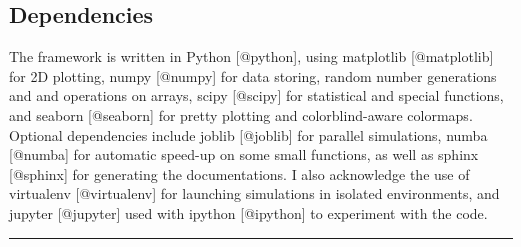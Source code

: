 \hypertarget{dependencies}{%
\subsection{Dependencies}\label{dependencies}}

The framework is written in Python {[}@python{]}, using matplotlib
{[}@matplotlib{]} for 2D plotting, numpy {[}@numpy{]} for data storing,
random number generations and and operations on arrays, scipy
{[}@scipy{]} for statistical and special functions, and seaborn
{[}@seaborn{]} for pretty plotting and colorblind-aware colormaps.
Optional dependencies include joblib {[}@joblib{]} for parallel
simulations, numba {[}@numba{]} for automatic speed-up on some small
functions, as well as sphinx {[}@sphinx{]} for generating the
documentations. I also acknowledge the use of virtualenv
{[}@virtualenv{]} for launching simulations in isolated environments,
and jupyter {[}@jupyter{]} used with ipython {[}@ipython{]} to
experiment with the code.

\begin{center}\rule{0.5\linewidth}{\linethickness}\end{center}
